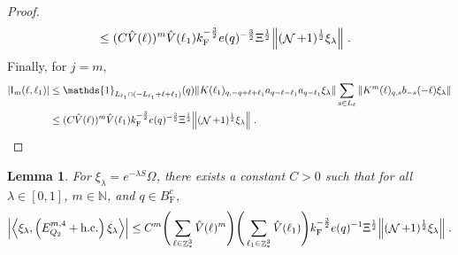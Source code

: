 \documentclass[12pt,a4paper]{article}
\numberwithin{equation}{section}
\newcommand{\NNN}{\mathbb{N}}
\newcommand{\1}{\mathbb{I}}
\newcommand{\F}{\mathrm{F}}
\newcommand{\I}{\mathrm{I}}
\DeclareMathOperator{\Z}{\mathbb{Z}}
\DeclareMathOperator{\NN}{\mathcal{N}}
\newcommand{\half}{\frac{1}{2}}
\newcommand{\eva}[1]{\left\langle #1 \right\rangle}
\theoremstyle{plain}
\newtheorem{lemma}[theorem]{Lemma}
\theoremstyle{definition}
\theoremstyle{remark}
\theoremstyle{plain}
\theoremstyle{definition}
\theoremstyle{remark}
\begin{document}
\begin{proof}
\begin{align}
	&\leq (C \hat{V}(\ell))^m
		\hat{V}(\ell_1)
		k_{\F}^{-\frac 32} e(q)^{-\frac 32} \Xi^\half
		\norm{ (\NN+1)^\half \xi_\lambda} \;. \label{eq:estEQ2152}
\end{align}
Finally, for $ j = m $,
\begin{align}
	|\I_m(\ell, \ell_1)|
	&\leq \mathds{1}_{L_{\ell_1} \cap (-L_{\ell_1} + \ell + \ell_1)}(q) \norm{K(\ell_1)_{q,-q+\ell+\ell_1} a_{q-\ell-\ell_1} a_{q-\ell_1} \xi_\lambda}
		\sum_{ s \in L_{\ell}}
		\norm{ K^m(\ell)_{q,s} b_{-s}(-\ell) \xi_\lambda }\nonumber\\
	&\leq (C \hat{V}(\ell))^m
		\hat{V}(\ell_1)
		k_{\F}^{-\frac 32} e(q)^{-\frac 32} \Xi^\half
		\norm{(\NN+1)^\half\xi_\lambda} \;. \label{eq:estEQ2153}
\end{align}
\end{proof}


\begin{lemma} \label{lem:EQ217}
For $\xi_\lambda = e^{-\lambda S} \Omega$, there exists a constant $ C > 0 $ such that for all $ \lambda \in [0,1] $, $ m \in \NNN $, and $ q \in B_{\F}^c $,
\begin{align}
	\abs{\eva{\xi_\lambda,\left(E^{m,4}_{Q_2}+\mathrm{h.c.}\right) \xi_\lambda }}
	\leq C^m \Bigg(\sum_{\ell\in \Z^3_*} \hat{V}(\ell)^m \Bigg)
		\Bigg(\sum_{\ell_1\in \Z^3_*} \hat{V}(\ell_1) \Bigg)
		k_{\F}^{-\frac{3}{2}} e(q)^{-1} \Xi^{\half} 
		\norm{(\NN+1)^\half \xi_\lambda } \;. \label{eq:estEQ217}
\end{align}
\end{lemma}
\end{document}
